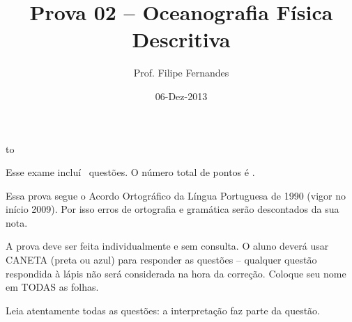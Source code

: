 \documentclass[letterpaper,portuguese,12pt,pdftex]{exam}
\title{Prova 02 -- Oceanografia Física Descritiva}
\author{Prof. Filipe Fernandes}
\date{06-Dez-2013}
\begin{document}
\maketitle
\doublespacing

\vspace{1cm}
\hbox to \textwidth{Nome e número de matrícula:\enspace\hrulefill}
\vspace{1cm}

\begin{minipage}{.8\textwidth}
Esse exame incluí \numquestions\ questões. O número total de pontos é \numpoints.
\vspace{1cm}

Essa prova segue o Acordo Ortográfico da Língua Portuguesa de 1990 (vigor no
início 2009).  Por isso erros de ortografia e gramática serão descontados da sua
nota.

A prova deve ser feita individualmente e sem consulta.  O aluno deverá usar
CANETA (preta ou azul) para responder as questões – qualquer questão respondida
à lápis não será considerada na hora da correção.  Coloque seu nome em TODAS as
folhas.

\vspace{1cm}

Leia atentamente todas as questões: a interpretação faz parte da questão.

\end{minipage}

\clearpage
\end{document}

